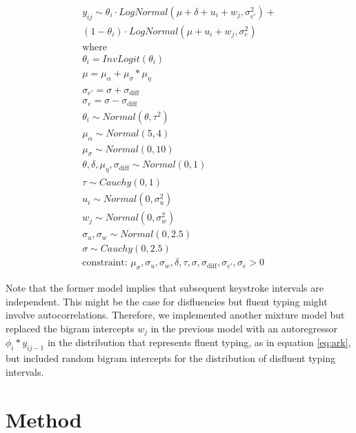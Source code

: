 \documentclass[english,jou,floatsintext]{apa7}
\begin{document}
\[
\tag{3}
\begin{aligned}
    y_{ij} \sim \theta_i \cdot LogNormal(\mu + \delta + u_i + w_j, \sigma_{e'}^2) +\\
        (1 - \theta_i) \cdot LogNormal(\mu + u_i + w_j, \sigma_{e}^2)\\
        \text{where}\\
        \theta_i = InvLogit(\theta_i)\\
        \mu = \mu_{\alpha} + \mu_{\sigma} * \mu_{\eta}\\
        \sigma_{e'} = \sigma + \sigma_{\text{diff}}\\
        \sigma_{e} = \sigma - \sigma_{\text{diff}}\\
        \theta_i \sim Normal(\theta,\tau^2)\\
    \mu_{\alpha} \sim Normal(5,4)\\
    \mu_{\sigma} \sim Normal(0,10)\\
        \theta, \delta, \mu_{\eta}, \sigma_{\text{diff}} \sim Normal(0,1)\\
        \tau \sim Cauchy(0,1)\\
        u_i \sim Normal(0, \sigma_u^2)\\
    w_j \sim Normal(0, \sigma_w^2)\\
    \sigma_u, \sigma_w \sim Normal(0,2.5)\\
        \sigma \sim Cauchy(0,2.5)\\
        \text{constraint: } \mu_{\sigma}, \sigma_u, \sigma_w, \delta, \tau, \sigma, \sigma_{\text{diff}}, \sigma_{e'}, \sigma_{e} > 0
\end{aligned}   
\label{eq:mog}
\]

Note that the former model implies that subsequent keystroke intervals are independent. This might be the case for disfluencies but fluent typing might involve autocorrelations. Therefore, we implemented another mixture model but replaced the bigram intercepts \(w_j\) in the previous model with an autoregressor \(\phi_i*y_{ij-1}\) in the distribution that represents fluent typing, as in equation \ref{eq:ark}, but included random bigram intercepts for the distribution of disfluent typing intervals.

\hypertarget{method}{%
\section{Method}\label{method}}
\end{document}
